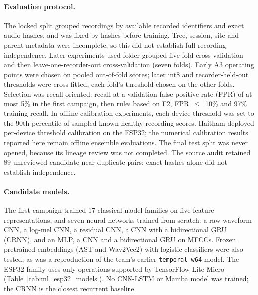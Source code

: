 \paragraph{Evaluation protocol.} The locked split grouped recordings by available recorded identifiers and exact audio hashes, and was fixed by hashes before training. Tree, session, site and parent metadata were incomplete, so this did not establish full recording independence. Later experiments used folder-grouped five-fold cross-validation and then leave-one-recorder-out cross-validation (seven folds). Early A3 operating points were chosen on pooled out-of-fold scores; later int8 and recorder-held-out thresholds were cross-fitted, each fold's threshold chosen on the other folds. Selection was recall-oriented: recall at a validation false-positive rate (FPR) of at most 5\% in the first campaign, then rules based on F2, FPR~$\le$~10\% and 97\% training recall. In offline calibration experiments, each device threshold was set to the 90th percentile of sampled known-healthy recording scores. Haitham deployed per-device threshold calibration on the ESP32; the numerical calibration results reported here remain offline ensemble evaluations. The final test split was never opened, because its lineage review was not completed. The source audit retained 89 unreviewed candidate near-duplicate pairs; exact hashes alone did not establish independence.

\paragraph{Candidate models.} The first campaign trained 17 classical model families on five feature representations, and seven neural networks trained from scratch: a raw-waveform CNN, a log-mel CNN, a residual CNN, a CNN with a bidirectional GRU (CRNN), and an MLP, a CNN and a bidirectional GRU on MFCCs. Frozen pretrained embeddings (AST and Wav2Vec2) with logistic classifiers were also tested, as was a reproduction of the team's earlier \texttt{temporal\_w64} model. The ESP32 family uses only operations supported by TensorFlow Lite Micro (Table~\ref{tab:ml_esp32_models}). No CNN-LSTM or Mamba model was trained; the CRNN is the closest recurrent baseline.

